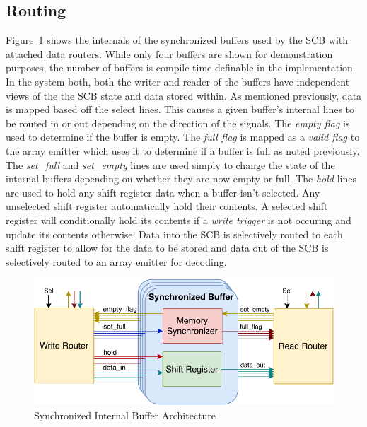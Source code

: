     \subsection{Routing}
        Figure~\ref{fig:sb_arch} shows the internals of the synchronized buffers used by the SCB with attached data routers. While only four buffers are shown for demonstration purposes, the number of buffers is compile time definable in the implementation. In the system both, both the writer and reader of the buffers have independent views of the the SCB state and data stored within. As mentioned previously, data is mapped based off the select lines. This causes a given buffer's internal lines to be routed in or out depending on the direction of the signals. The {\it empty flag} is used to determine if the buffer is empty. The {\it full flag} is mapped as a {\it valid flag} to the array emitter which uses it to determine if a buffer is full as noted previously. The {\it set\_full} and {\it set\_empty} lines are used simply to change the state of the internal buffers depending on whether they are now empty or full. The {\it hold} lines are used to hold any shift register data when a buffer isn't selected. Any unselected shift register automatically hold their contents. A selected shift register will conditionally hold its contents if a {\it write trigger} is not occuring and update its contents otherwise. Data into the SCB is selectively routed to each shift register to allow for the data to be stored and data out of the SCB is selectively routed to an array emitter for decoding.

        \begin{figure}
            \centering
            \includegraphics[width=1.0\textwidth]{fig/pdp_sb_arch.pdf}
            \caption{Synchronized Internal Buffer Architecture}
            \label{fig:sb_arch}
        \end{figure}

